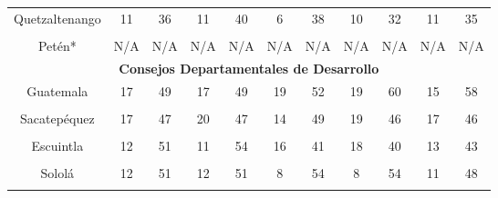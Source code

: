 {\begin{tabular}[t]{ccccccccccc}
Quetzaltenango & 11 & 36 & 11 & 40 & 6 & 38 & 10 & 32 & 11 & 35\\
\cellcolor[HTML]{B6B3FF}{Quiché} & \cellcolor[HTML]{B6B3FF}{15} & \cellcolor[HTML]{B6B3FF}{39} & \cellcolor[HTML]{B6B3FF}{14} & \cellcolor[HTML]{B6B3FF}{43} & \cellcolor[HTML]{B6B3FF}{12} & \cellcolor[HTML]{B6B3FF}{46} & \cellcolor[HTML]{B6B3FF}{10} & \cellcolor[HTML]{B6B3FF}{47} & \cellcolor[HTML]{B6B3FF}{8} & \cellcolor[HTML]{B6B3FF}{38}\\
Petén* & N/A & N/A & N/A & N/A & N/A & N/A & N/A & N/A & N/A & N/A\\
\midrule
\multicolumn{11}{c}{\color{color3}\textbf{Consejos Departamentales de Desarrollo}}\\
\midrule
Guatemala & 17 & 49 & 17 & 49 & 19 & 52 & 19 & 60 & 15 & 58\\
\cellcolor[HTML]{B6B3FF}{El Progreso} & \cellcolor[HTML]{B6B3FF}{10} & \cellcolor[HTML]{B6B3FF}{34} & \cellcolor[HTML]{B6B3FF}{13} & \cellcolor[HTML]{B6B3FF}{37} & \cellcolor[HTML]{B6B3FF}{10} & \cellcolor[HTML]{B6B3FF}{37} & \cellcolor[HTML]{B6B3FF}{10} & \cellcolor[HTML]{B6B3FF}{36} & \cellcolor[HTML]{B6B3FF}{9} & \cellcolor[HTML]{B6B3FF}{39}\\
Sacatepéquez & 17 & 47 & 20 & 47 & 14 & 49 & 19 & 46 & 17 & 46\\
\cellcolor[HTML]{B6B3FF}{Chimaltenango} & \cellcolor[HTML]{B6B3FF}{21} & \cellcolor[HTML]{B6B3FF}{49} & \cellcolor[HTML]{B6B3FF}{21} & \cellcolor[HTML]{B6B3FF}{50} & \cellcolor[HTML]{B6B3FF}{24} & \cellcolor[HTML]{B6B3FF}{48} & \cellcolor[HTML]{B6B3FF}{22} & \cellcolor[HTML]{B6B3FF}{48} & \cellcolor[HTML]{B6B3FF}{21} & \cellcolor[HTML]{B6B3FF}{48}\\
Escuintla & 12 & 51 & 11 & 54 & 16 & 41 & 18 & 40 & 13 & 43\\
\cellcolor[HTML]{B6B3FF}{Santa Rosa} & \cellcolor[HTML]{B6B3FF}{9} & \cellcolor[HTML]{B6B3FF}{48} & \cellcolor[HTML]{B6B3FF}{10} & \cellcolor[HTML]{B6B3FF}{48} & \cellcolor[HTML]{B6B3FF}{10} & \cellcolor[HTML]{B6B3FF}{49} & \cellcolor[HTML]{B6B3FF}{10} & \cellcolor[HTML]{B6B3FF}{49} & \cellcolor[HTML]{B6B3FF}{10} & \cellcolor[HTML]{B6B3FF}{50}\\
Sololá & 12 & 51 & 12 & 51 & 8 & 54 & 8 & 54 & 11 & 48\\
\cellcolor[HTML]{B6B3FF}{Totonicapán} & \cellcolor[HTML]{B6B3FF}{12} & \cellcolor[HTML]{B6B3FF}{40} & \cellcolor[HTML]{B6B3FF}{11} & \cellcolor[HTML]{B6B3FF}{40} & \cellcolor[HTML]{B6B3FF}{11} & \cellcolor[HTML]{B6B3FF}{42} & \cellcolor[HTML]{B6B3FF}{10} & \cellcolor[HTML]{B6B3FF}{44} & \cellcolor[HTML]{B6B3FF}{9} & \cellcolor[HTML]{B6B3FF}{48}\\

\end{tabular}}
